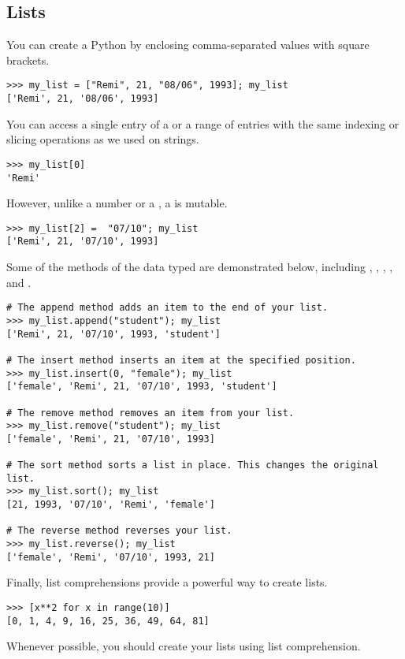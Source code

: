 \subsection*{Lists}
You can create a Python  by enclosing comma-separated values with square brackets. 
\begin{lstlisting}
>>> my_list = ["Remi", 21, "08/06", 1993]; my_list
['Remi', 21, '08/06', 1993]
\end{lstlisting}
You can access a single entry of a  or a range of entries with the same indexing or slicing operations as we used on strings. 
\begin{lstlisting}
>>> my_list[0]
'Remi'
\end{lstlisting}
However, unlike a number or a , a  is mutable. 
\begin{lstlisting}
>>> my_list[2] =  "07/10"; my_list
['Remi', 21, '07/10', 1993]
\end{lstlisting}
Some of the methods of the  data typed are demonstrated below, including , , , , and .

\begin{lstlisting}
# The append method adds an item to the end of your list.
>>> my_list.append("student"); my_list
['Remi', 21, '07/10', 1993, 'student']

# The insert method inserts an item at the specified position. 
>>> my_list.insert(0, "female"); my_list
['female', 'Remi', 21, '07/10', 1993, 'student']

# The remove method removes an item from your list.
>>> my_list.remove("student"); my_list
['female', 'Remi', 21, '07/10', 1993]

# The sort method sorts a list in place. This changes the original list.
>>> my_list.sort(); my_list
[21, 1993, '07/10', 'Remi', 'female']

# The reverse method reverses your list.
>>> my_list.reverse(); my_list
['female', 'Remi', '07/10', 1993, 21]
\end{lstlisting}

Finally, list comprehensions provide a powerful way to create lists. 
\begin{lstlisting}
>>> [x**2 for x in range(10)]
[0, 1, 4, 9, 16, 25, 36, 49, 64, 81]
\end{lstlisting}

Whenever possible, you should create your lists using list comprehension.


